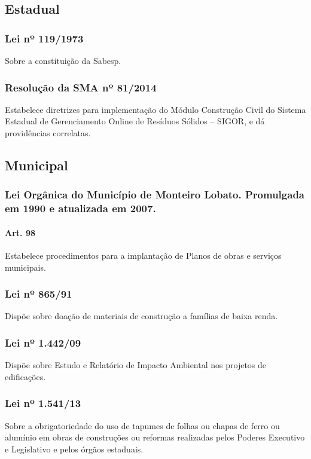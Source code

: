 \begin{subapend}
	\subsection{Estadual}
	\begin{subsubapend}
		\item \subsubsection{Lei nº 119/1973}
		Sobre a constituição da Sabesp.
		\subsubsection{Resolução da SMA nº 81/2014}
		Estabelece diretrizes para implementação do Módulo Construção Civil do Sistema Estadual de Gerenciamento Online de Resíduos Sólidos – SIGOR, e dá providências correlatas.
		\subsection{Municipal}
		\subsubsection{Lei Orgânica do Município de Monteiro Lobato. Promulgada em 1990 e atualizada em 2007.}
		\paragraph {Art. 98} Estabelece procedimentos para a implantação de Planos de obras e serviços municipais.
		\subsubsection{Lei nº 865/91}
		Dispõe sobre doação de materiais de construção a famílias de baixa renda.
		\subsubsection{Lei nº 1.442/09}
		Dispõe sobre Estudo e Relatório de Impacto Ambiental nos projetos de edificações.
		\subsubsection{Lei nº 1.541/13}
		Sobre a obrigatoriedade do uso de tapumes de folhas ou chapas de ferro ou alumínio em obras de construções ou reformas realizadas pelos Poderes Executivo e Legislativo e pelos órgãos estaduais.
	\end{subsubapend}
\end{subapend}



